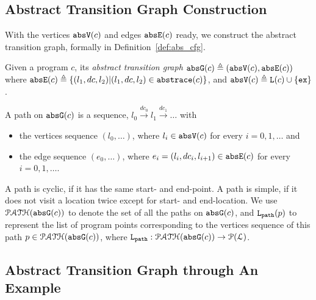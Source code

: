 \subsection{Abstract Transition Graph Construction} 
With the vertices $\mathtt{abs}{\mathtt{V}}(c)$ and edges $\mathtt{abs}{\mathtt{E}}(c)$ ready, we construct the abstract transition graph, formally in
Definition~\ref{def:abs_cfg}.
%
\begin{defn}
\label{def:abs_cfg}
Given a program $c$, 
its \emph{abstract transition graph} $\mathtt{abs}{\mathtt{G}}(c) \triangleq (\mathtt{abs}{\mathtt{V}}(c), \mathtt{abs}{\mathtt{E}}(c))$ where
$\mathtt{abs}{\mathtt{E}}(c) \triangleq \{(l_1, dc, l_2) | (l_1, dc, l_2) \in \mathtt{abs}{\mathtt{trace}}(c)\}$,
and
$\mathtt{abs}{\mathtt{V}}(c) \triangleq \mathtt{L}(c)\cup\{\mathtt{ex}\}$.

A path on $\mathtt{abs}{\mathtt{G}}(c)$ is a sequence, $ l_0 \xrightarrow{dc_0} l_1 \xrightarrow{dc_1} \ldots $ with
\begin{itemize}
\item the vertices sequence $(l_0, \ldots)$, where $l_i \in \mathtt{abs}{\mathtt{V}}(c)$ for every $i = 0, 1, \ldots$ and
%
\item the edge sequence $(e_0, \ldots)$, where $e_i = (l_{i}, dc_i, l_{i + 1}) \in \mathtt{abs}{\mathtt{E}}(c)$ for every $i = 0, 1, \ldots$.
\end{itemize}
A path is cyclic, if it has the same start- and end-point. A path is simple, if it does not visit a location twice except for start- and end-location. We use $\mathcal{PATH}(\mathtt{abs}{\mathtt{G}}(c))$ to denote the set of all the paths on $\mathtt{abs}{\mathtt{G}}(c)$,
and $\mathtt{L}_{\mathtt{path}}(p)$ to represent the list of program points corresponding to the vertices sequence of this path $p \in \mathcal{PATH}(\mathtt{abs}{\mathtt{G}}(c))$,
where $\mathtt{L}_{\mathtt{path}} : \mathcal{PATH}(\mathtt{abs}{\mathtt{G}}(c)) \to \mathcal{P}{(\mathcal{L})}$.
\end{defn}
\subsection{Abstract Transition Graph through An Example}
\label{sec:abs_prog_example}
% 
